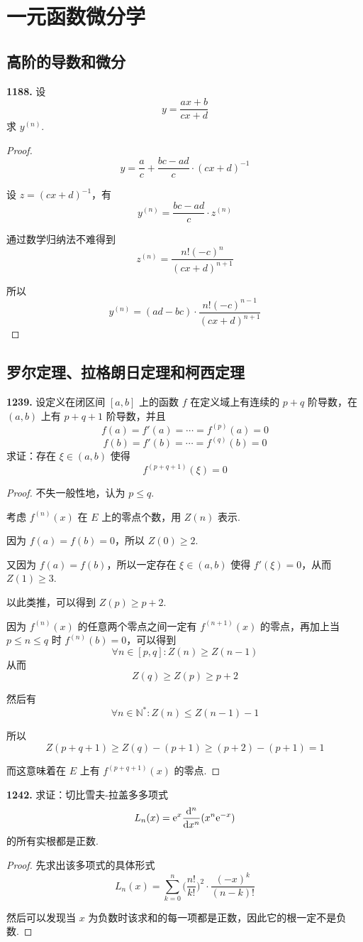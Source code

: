 \section{一元函数微分学}
\subsection{高阶的导数和微分}
\textbf{1188.} 设
\[y = \frac{ax + b}{cx + d}\]
求 $y^{(n)}$.

\begin{proof}
    \[y = \frac{a}{c} + \frac{bc - ad}{c} \cdot (cx + d)^{-1}\]

    设 $z = (cx + d)^{-1}$，有
    \[y^{(n)} = \frac{bc - ad}{c} \cdot z^{(n)}\]

    通过数学归纳法不难得到
    \[z^{(n)} = \frac{n!(-c)^n}{(cx + d)^{n+1}}\]

    所以
    \[y^{(n)} = (ad - bc) \cdot \frac{n! (-c)^{n-1}}{(cx + d)^{n+1}}\]
\end{proof}

\subsection{罗尔定理、拉格朗日定理和柯西定理}

\textbf{1239.} 设定义在闭区间 $[a,b]$ 上的函数 $f$ 在定义域上有连续的 $p+q$ 阶导数，在 $(a,b)$ 上有 $p + q + 1$ 阶导数，并且
\[f(a) = f'(a) = \cdots = f^{(p)}(a) = 0\]
\[f(b) = f'(b) = \cdots = f^{(q)}(b) = 0\]
求证：存在 $\xi \in (a,b)$ 使得
\[f^{(p + q + 1)}(\xi) = 0\]

\begin{proof}
    不失一般性地，认为 $p \leqslant q$.

    考虑 $f^{(n)}(x)$ 在 $E$ 上的零点个数，用 $Z(n)$ 表示.

    因为 $f(a) = f(b) = 0$，所以 $Z(0) \geqslant 2$.

    又因为 $f(a) = f(b)$，所以一定存在 $\xi \in (a,b)$ 使得 $f'(\xi) = 0$，从而 $Z(1) \geqslant 3$.

    以此类推，可以得到 $Z(p) \geqslant p + 2$.

    因为 $f^{(n)}(x)$ 的任意两个零点之间一定有 $f^{(n+1)}(x)$ 的零点，再加上当 $p \leqslant n \leqslant q$ 时 $f^{(n)}(b) = 0$，可以得到
    \[\forall n \in [p,q]: Z(n) \geqslant Z(n-1)\]
    从而
    \[Z(q) \geqslant Z(p) \geqslant p + 2\]

    然后有
    \[\forall n \in \mathbb{N}^*: Z(n) \leqslant Z(n-1) - 1\]

    所以
    \[Z(p+q+1) \geqslant Z(q) - (p + 1) \geqslant (p+2) - (p+1) = 1\]

    而这意味着在 $E$ 上有 $f^{(p+q+1)}(x)$ 的零点.
\end{proof}\vspace{9pt}

\textbf{1242.} 求证：切比雪夫-拉盖多多项式
\[L_n(x) = \mathrm{e}^x \frac{\mathop{}\!\mathrm{d}^n}{\mathop{}\!\mathrm{d} x^n}(x^n \mathrm{e}^{-x})\]
的所有实根都是正数.

\begin{proof}
    先求出该多项式的具体形式
    \[L_n(x) = \sum_{k=0}^{n} \biggl(\frac{n!}{k!}\biggr)^2 \cdot \frac{(-x)^k}{(n-k)!}\]

    然后可以发现当 $x$ 为负数时该求和的每一项都是正数，因此它的根一定不是负数.
\end{proof}